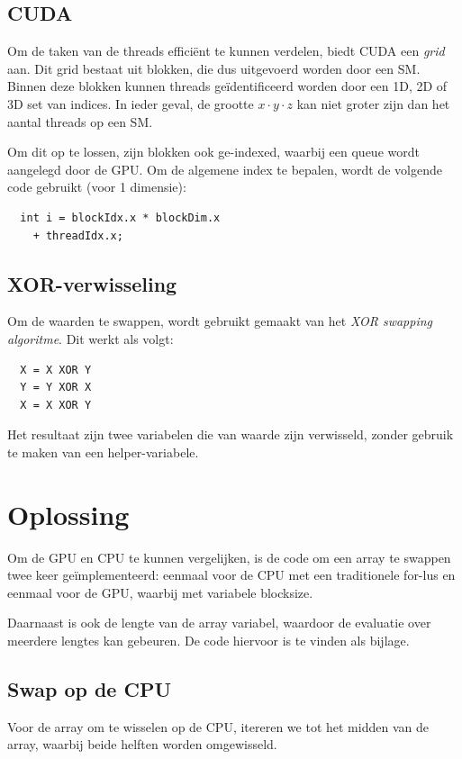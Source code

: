 \documentclass[twocolumn, a4paper]{article}
\begin{document}
\subsection{CUDA}
Om de taken van de threads effici\"ent te kunnen verdelen, biedt CUDA een \emph{grid} aan. Dit grid bestaat uit blokken, die dus uitgevoerd worden door een SM. Binnen deze blokken kunnen threads ge\"identificeerd worden door een 1D, 2D of 3D set van indices. In ieder geval, de grootte $x \cdot y \cdot z$ kan niet groter zijn dan het aantal threads op een SM.

Om dit op te lossen, zijn blokken ook ge-indexed, waarbij een queue wordt aangelegd door de GPU. Om de algemene index te bepalen, wordt de volgende code gebruikt (voor 1 dimensie): 

\begin{verbatim}
  int i = blockIdx.x * blockDim.x 
    + threadIdx.x;
\end{verbatim}
\label{c:index}

\subsection{XOR-verwisseling}
Om de waarden te swappen, wordt gebruikt gemaakt van het \emph{XOR swapping algoritme}. Dit werkt als volgt:

\begin{verbatim}
  X = X XOR Y
  Y = Y XOR X
  X = X XOR Y
\end{verbatim}

Het resultaat zijn twee variabelen die van waarde zijn verwisseld, zonder gebruik te maken van een helper-variabele.

\section{Oplossing}
Om de GPU en CPU te kunnen vergelijken, is de code om een array te swappen twee keer ge\"implementeerd: eenmaal voor de CPU met een traditionele for-lus en eenmaal voor de GPU, waarbij met variabele blocksize.

Daarnaast is ook de lengte van de array variabel, waardoor de evaluatie over meerdere lengtes kan gebeuren. De code hiervoor is te vinden als bijlage.


\subsection{Swap op de CPU}
Voor de array om te wisselen op de CPU, itereren we tot het midden van de array, waarbij beide helften worden omgewisseld.
\end{document}
